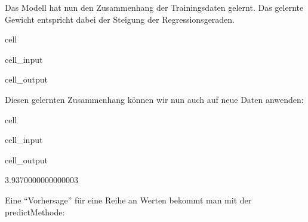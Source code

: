 \documentclass[letterpaper,10pt,english]{jupyterBook}
\begin{document}
\sphinxAtStartPar
Das Modell hat nun den Zusammenhang der Trainingsdaten gelernt.
Das gelernte Gewicht entspricht dabei der Steigung der Regressionsgeraden.

\begin{sphinxuseclass}{cell}\begin{sphinxVerbatimInput}

\begin{sphinxuseclass}{cell_input}
\begin{sphinxVerbatim}[commandchars=\\\{\}]
\end{sphinxVerbatim}

\end{sphinxuseclass}\end{sphinxVerbatimInput}
\begin{sphinxVerbatimOutput}

\begin{sphinxuseclass}{cell_output}
\begin{sphinxVerbatim}[commandchars=\\\{\}]
[1.8]
\end{sphinxVerbatim}

\end{sphinxuseclass}\end{sphinxVerbatimOutput}

\end{sphinxuseclass}
\sphinxAtStartPar
Diesen gelernten Zusammenhang können wir nun auch auf neue Daten anwenden:

\begin{sphinxuseclass}{cell}\begin{sphinxVerbatimInput}

\begin{sphinxuseclass}{cell_input}
\begin{sphinxVerbatim}[commandchars=\\\{\}]
  
\end{sphinxVerbatim}

\end{sphinxuseclass}\end{sphinxVerbatimInput}
\begin{sphinxVerbatimOutput}

\begin{sphinxuseclass}{cell_output}
\begin{sphinxVerbatim}[commandchars=\\\{\}]
3.9370000000000003
\end{sphinxVerbatim}

\end{sphinxuseclass}\end{sphinxVerbatimOutput}

\end{sphinxuseclass}
\sphinxAtStartPar
Eine “Vorhersage” für eine Reihe an Werten bekommt man mit der predict\sphinxhyphen{}Methode:
\end{document}
